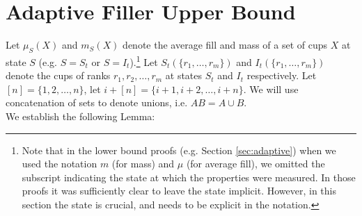 \documentclass[twocolumn]{article}[10pt]
\begin{document}
\section{Adaptive Filler Upper Bound}\label{sec:adaptiveUpperBound}
Let $\mu_S(X)$ and $m_S(X)$ denote the average fill and mass of a set of cups $X$
at state $S$ (e.g. $S=S_t$ or $S=I_t$).\footnote{Note that in the lower bound
  proofs (e.g. Section \ref{sec:adaptive}) when we used the notation $m$ (for
  mass) and $\mu$ (for average fill), we omitted the subscript indicating the
  state at which the properties were measured. In those proofs it was
sufficiently clear to leave the state implicit. However, in this section the
state is crucial, and needs to be explicit in the notation.}
Let $S_t(\{r_1, \ldots, r_m\})$ and $I_t(\{r_1,\ldots, r_m\})$ denote the cups
of ranks $r_1, r_2, \ldots, r_m$ at states $S_t$ and $I_t$ respectively.
Let $[n] = \{1,2,\ldots, n\}$, let $i+[n] = \{i+1, i+2, \ldots, i+n\}$. We will
use concatenation of sets to denote unions, i.e. $AB = A\cup B$.\\
We establish the following Lemma:
\end{document}
